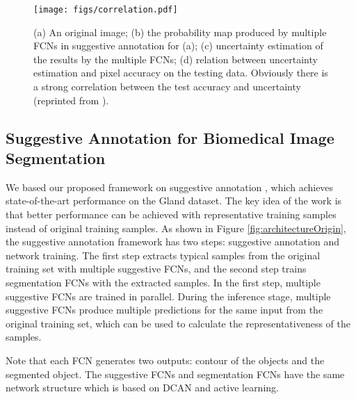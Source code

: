\documentclass[10pt,twocolumn,letterpaper]{article}
\begin{document}
\begin{figure}%
\begin{center}
\centerline{\texttt{[image: figs/correlation.pdf]}}
\end{center}
\vspace{-20pt}
   \caption{(a) An original image; (b) the probability map produced by multiple FCNs in suggestive annotation for (a);
(c) uncertainty estimation of the results by the multiple FCNs; (d) relation between uncertainty estimation
and pixel accuracy on the testing data. Obviously there is a strong correlation between the test accuracy and uncertainty (reprinted from \cite{yang2017suggestive}).}
\label{fig:correlation}
\vspace{-10pt}
\end{figure}



\subsection{Suggestive Annotation for Biomedical Image Segmentation}
We based our proposed framework on suggestive annotation \cite{yang2017suggestive}, which achieves state-of-the-art performance on the Gland dataset.
The key idea of the work is that better performance can be achieved with representative training samples instead of original training samples.
As shown in Figure \ref{fig:architectureOrigin}, the suggestive annotation framework \cite{yang2017suggestive} has two steps: suggestive annotation and network training.
The first step extracts typical samples from the original training set with multiple suggestive FCNs, and the second step trains segmentation FCNs with the extracted samples.
In the first step, multiple suggestive FCNs are trained in parallel.
During the inference stage, multiple suggestive FCNs produce multiple predictions for the same input from the original training set, which can be used to calculate the representativeness of the samples.

Note that each FCN generates two outputs: contour of the objects and the segmented object.
The suggestive FCNs and segmentation FCNs have the same network structure which is based on DCAN \cite{chen2016dcan} and active learning.
\end{document}
